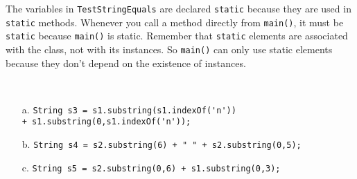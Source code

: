 \begin{ANS}
\item  The variables in {\tt TestStringEquals} are declared {\tt static}
because they are used in {\tt static} methods.  Whenever you call a
method directly from {\tt main()}, it must be {\tt static} because
{\tt main()} is static.  Remember that {\tt static} elements are associated
with the class, not with its instances.  So {\tt main()} can only
use static elements because they don't depend on the existence
of instances.



\item\mbox{ }
\begin{enumerate}
\item[a.]  \verb|String s3 = s1.substring(s1.indexOf('n'))| \\             
       \verb|+ s1.substring(0,s1.indexOf('n'));|  
\item[b.]  \verb|String s4 = s2.substring(6) + " " + s2.substring(0,5);| 
\item[c.]  \verb|String s5 = s2.substring(0,6) + s1.substring(0,3);|     
\end{enumerate}

\end{ANS}

